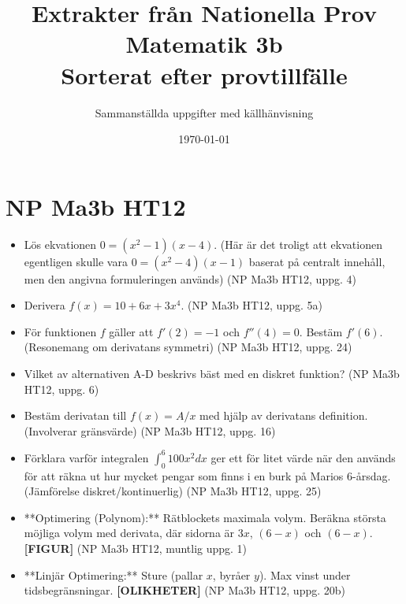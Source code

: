 \documentclass{article}
\title{Extrakter från Nationella Prov Matematik 3b \\ \large Sorterat efter provtillfälle}
\author{Sammanställda uppgifter med källhänvisning}
\date{\today}
\begin{document}
\maketitle

\section*{NP Ma3b HT12}
\begin{itemize}
    \item Lös ekvationen $0 = (x^2-1)(x-4)$. (Här är det troligt att ekvationen egentligen skulle vara $0 = (x^2-4)(x-1)$ baserat på centralt innehåll, men den angivna formuleringen används) (NP Ma3b HT12, uppg. 4)
    \item Derivera $f(x) = 10+6x+3x^4$. (NP Ma3b HT12, uppg. 5a)
    \item För funktionen $f$ gäller att $f'(2)=-1$ och $f''(4)=0$. Bestäm $f'(6)$. (Resonemang om derivatans symmetri) (NP Ma3b HT12, uppg. 24)
    \item Vilket av alternativen A-D beskrivs bäst med en diskret funktion? (NP Ma3b HT12, uppg. 6)
    \item Bestäm derivatan till $f(x) = A/x$ med hjälp av derivatans definition. (Involverar gränsvärde) (NP Ma3b HT12, uppg. 16)
    \item Förklara varför integralen $\int_0^6 100x^2 dx$ ger ett för litet värde när den används för att räkna ut hur mycket pengar som finns i en burk på Marios 6-årsdag. (Jämförelse diskret/kontinuerlig) (NP Ma3b HT12, uppg. 25)
    \item **Optimering (Polynom):** Rätblockets maximala volym. Beräkna största möjliga volym med derivata, där sidorna är $3x$, $(6-x)$ och $(6-x)$. \textbf{[FIGUR]} (NP Ma3b HT12, muntlig uppg. 1)
    \item **Linjär Optimering:** Sture (pallar $x$, byråer $y$). Max vinst under tidsbegränsningar. \textbf{[OLIKHETER]} (NP Ma3b HT12, uppg. 20b)
\end{itemize}
\end{document}
